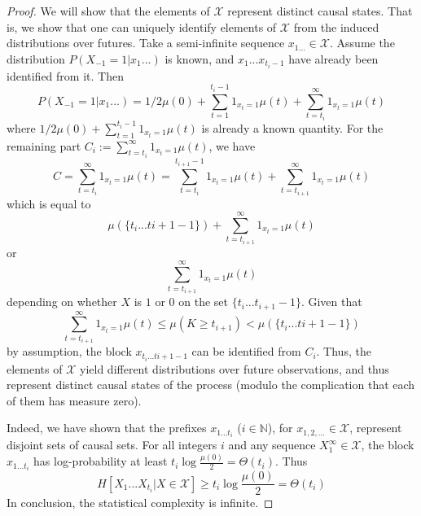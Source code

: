 \documentclass[11pt,letterpaper]{article}
\begin{document}
\begin{proof}
We will show that the elements of $\mathcal{X}$ represent distinct causal states.
That is, we show that one can uniquely identify elements of $\mathcal{X}$ from the induced distributions over futures.
Take a semi-infinite sequence $x_{1...} \in \mathcal{X}$.
Assume the distribution $P\left(X_{-1}=1|x_{1}...\right)$ is known, and $x_{1}...x_{t_i-1}$ have already been identified from it.
Then 
$$P\left(X_{-1}=1|x_{1}...\right) = 1/2 \mu(0) + \sum_{t=1}^{t_{i}-1} 1_{x_{t} = 1} \mu(t) + \sum_{t=t_i}^\infty 1_{x_{t} = 1} \mu(t)$$
where $1/2 \mu(0) + \sum_{t=1}^{t_{i}-1} 1_{x_{t} = 1} \mu(t)$ is already a known quantity.
For the remaining part $C_i := \sum_{t=t_i}^\infty 1_{x_{t} = 1} \mu(t)$, we have
$$C = \sum_{t=t_i}^\infty 1_{x_{t} = 1} \mu(t) = \sum_{t=t_i}^{t_{i+1}-1} 1_{x_{t} = 1} \mu(t) + \sum_{t=t_{i+1}}^\infty 1_{x_{t} = 1} \mu(t)$$
which is equal to 
$$\mu(\{t_i...t{i+1}-1\}) + \sum_{t=t_{i+1}}^\infty 1_{x_{t} = 1} \mu(t)$$
or
$$\sum_{t=t_{i+1}}^\infty 1_{x_{t} = 1} \mu(t)$$
depending on whether $X$ is $1$ or $0$ on the set $\{t_i...t_{i+1}-1\}$. Given that 
$$\sum_{t=t_{i+1}}^\infty 1_{x_{t} = 1} \mu(t) \leq \mu(K \geq t_{i+1}) < \mu(\{t_i...t{i+1}-1\})$$
by assumption, the block $x_{t_i...t{i+1}-1}$ can be identified from $C_i$.
Thus, the elements of $\mathcal{X}$ yield different distributions over future observations, and thus represent distinct causal states of the process (modulo the complication that each of them has measure zero).

Indeed, we have shown that the prefixes $x_{1\dots t_i}$ ($i \in \mathbb{N}$), for $x_{1,2,...} \in \mathcal{X}$, represent disjoint sets of causal sets.
For all integers $i$ and any sequence $X_1^\infty \in \mathcal{X}$, the block $x_{1...t_i}$ has log-probability at least $t_i \log \frac{\mu(0)}{2} = \Theta(t_i)$.
Thus
$$H[X_1...X_{t_i} | X \in \mathcal{X}] \geq  t_i \log \frac{\mu(0)}{2} = \Theta(t_i)$$
In conclusion, the statistical complexity is infinite.



\end{proof}
\end{document}
